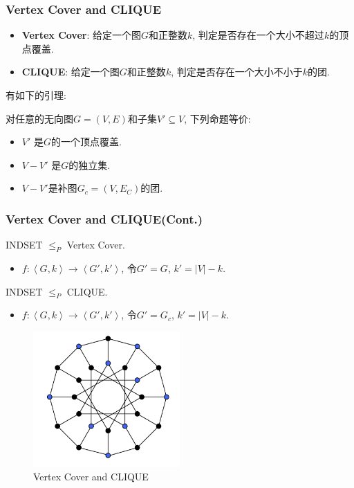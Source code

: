 \begin{frame}
    \frametitle{Vertex Cover and CLIQUE}
    \begin{definition}
        \begin{itemize}
            \item \textbf{Vertex Cover}: 给定一个图$G$和正整数$k$, 判定是否存在一个大小不超过$k$的顶点覆盖.
            \item \textbf{CLIQUE}: 给定一个图$G$和正整数$k$, 判定是否存在一个大小不小于$k$的团.
        \end{itemize}
    \end{definition}
    有如下的引理:
    \begin{lemma}
        对任意的无向图$G = (V,E)$和子集$V' \subseteq V$, 下列命题等价:
        \begin{itemize}
            \item $V'$ 是$G$的一个顶点覆盖.
            \item $V-V'$ 是$G$的独立集.
            \item $V - V'$是补图$G_c = (V, E_C)$的团.
        \end{itemize}
    \end{lemma}
\end{frame}

\begin{frame}
    \frametitle{Vertex Cover and CLIQUE(Cont.)}
    INDSET $\le_P$ Vertex Cover.
    \begin{itemize}
        \item $f: \left\langle G,k\right\rangle \rightarrow \left\langle G',k'\right\rangle$, 令$G' = G$, $k' = |V| - k$.
    \end{itemize}
    INDSET $\le_P$ CLIQUE.
    \begin{itemize}
        \item $f: \left\langle G,k\right\rangle \rightarrow \left\langle G',k'\right\rangle $, 令$G' = G_c$, $k' = |V| - k$.
    \end{itemize}
    \begin{figure}
        \centering
        \includegraphics[width=0.5\textwidth]{images/vc.png}
        \caption{Vertex Cover and CLIQUE}
    \end{figure}
\end{frame}

